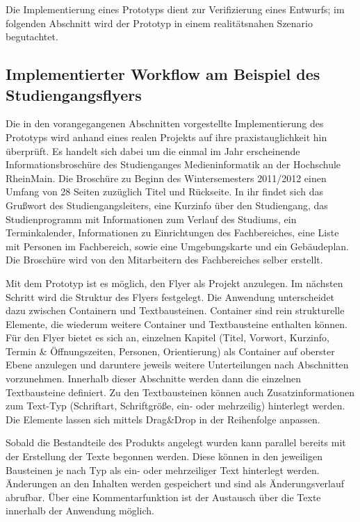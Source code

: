 \secbar

Die Implementierung eines Prototyps dient zur Verifizierung eines Entwurfs; im folgenden Abschnitt wird der Prototyp in einem realitätsnahen Szenario begutachtet.

\pagebreak

\subsection{Implementierter Workflow am Beispiel des Studiengangsflyers}

Die in den vorangegangenen Abschnitten vorgestellte Implementierung des Prototyps wird anhand eines realen Projekts auf ihre praxistauglichkeit hin überprüft. Es handelt sich dabei um die einmal im Jahr erscheinende Informationsbroschüre des Studienganges Medieninformatik an der Hochschule RheinMain. Die Broschüre zu Beginn des Wintersemesters 2011/2012 einen Umfang von 28 Seiten zuzüglich Titel und Rückseite. In ihr findet sich das Grußwort des Studiengangsleiters, eine Kurzinfo über den Studiengang, das Studienprogramm mit Informationen zum Verlauf des Studiums, ein Terminkalender, Informationen zu Einrichtungen des Fachbereiches, eine Liste mit Personen im Fachbereich, sowie eine Umgebungskarte und ein Gebäudeplan. Die Broschüre wird von den Mitarbeitern des Fachbereiches selber erstellt.

\bigskip

Mit dem Prototyp ist es möglich, den Flyer als Projekt anzulegen. Im nächsten Schritt wird die Struktur des Flyers festgelegt. Die Anwendung unterscheidet dazu zwischen Containern und Textbausteinen. Container sind rein strukturelle Elemente, die wiederum weitere Container und Textbausteine enthalten können. Für den Flyer bietet es sich an, einzelnen Kapitel (Titel, Vorwort, Kurzinfo, Termin \& Öffnungszeiten, Personen, Orientierung) als Container auf oberster Ebene anzulegen und daruntere jeweils weitere Unterteilungen nach Abschnitten vorzunehmen. Innerhalb dieser Abschnitte werden dann die einzelnen Textbausteine definiert. Zu den Textbausteinen können auch Zusatzinformationen zum Text-Typ (Schriftart, Schriftgröße, ein- oder mehrzeilig) hinterlegt werden. Die Elemente lassen sich mittels Drag\&Drop in der Reihenfolge anpassen.

Sobald die Bestandteile des Produkts angelegt wurden kann parallel bereits mit der Erstellung der Texte begonnen werden. Diese können in den jeweiligen Bausteinen je nach Typ als ein- oder mehrzeiliger Text hinterlegt werden. Änderungen an den Inhalten werden gespeichert und sind als Änderungsverlauf abrufbar. Über eine Kommentarfunktion ist der Austausch über die Texte innerhalb der Anwendung möglich. 

